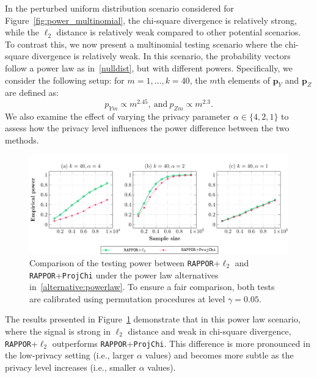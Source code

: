 \documentclass[twoside,11pt]{article}
\newcommand{\rvTwo}{Y}
\newcommand{\rvThree}{Z}
\newcommand{\vectorize}[1]{\mathbf{#1}}
\newcommand{\alphabetSize}{k} %
\newcommand{\vectorIndex}{m}
\newcommand{\probVecElement}[2]{p_{{#1}{#2}}}
\newcommand{\privacyParameter}{\alpha} %
\begin{document}
\begin{appendix}
	In the perturbed uniform distribution scenario considered for Figure~\ref{fig:power_multinomial}, the chi-square divergence is relatively strong, while the $\ell_2$ distance is relatively weak compared to other potential scenarios. To contrast this, we now present a multinomial testing scenario where the chi-square divergence is relatively weak. In this scenario, the probability vectors follow a power law as in~\eqref{nulldist}, but with different powers. Specifically, we consider the following setup: for $\vectorIndex = 1, \ldots, \alphabetSize=40$, the \( m \)th elements of \( \vectorize{p}_Y \) and \( \vectorize{p}_Z \) are defined as:
	\begin{equation}\label{alternative:powerlaw}
		\probVecElement{\rvTwo}{\vectorIndex}
		\propto 
		\vectorIndex^{2.45},
		~\text{and}~
		\probVecElement{\rvThree}{\vectorIndex}
		\propto 
		\vectorIndex^{2.3}.
	\end{equation}
	We also examine the effect of varying the privacy parameter $\privacyParameter \in \{4, 2, 1\}$ to assess how the privacy level influences the power difference between the two methods. 
	\begin{figure}
		\centering
		\includegraphics[width=0.95\linewidth]{power24.pdf}
		\caption{Comparison of the testing power between 
			\texttt{RAPPOR}+$\ell_2$ and \texttt{RAPPOR}+\texttt{ProjChi} under the power law alternatives in~\eqref{alternative:powerlaw}. To ensure a fair comparison, both tests are calibrated using permutation procedures at level $\gamma = 0.05$.}
		\label{fig:power_powerlaw_24}
	\end{figure}
	The results presented in Figure~\ref{fig:power_powerlaw_24} demonstrate that in this power law scenario, where the signal is strong in $\ell_2$ distance and weak in chi-square divergence, \texttt{RAPPOR}+$\ell_2$ outperforms \texttt{RAPPOR}+\texttt{ProjChi}. This difference is more pronounced in the low-privacy setting (i.e., larger $\privacyParameter$ values) and becomes more subtle as the privacy level increases (i.e., smaller $\privacyParameter$ values).
	

\end{appendix}
\end{document}
